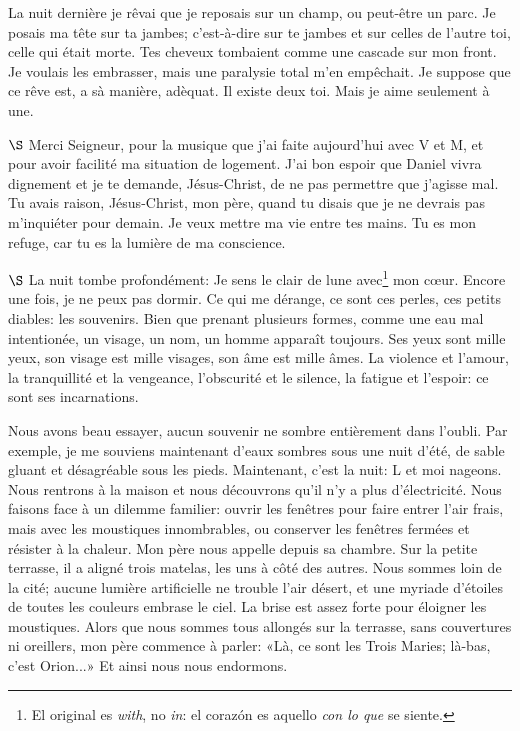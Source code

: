 \documentclass[a4paper, 12pt]{article}
\begin{document}
La nuit dernière je rêvai que je reposais sur un champ, ou peut-être un parc. Je
posais ma tête sur ta jambes; c'est-à-dire sur te jambes et sur celles de
l'autre toi, celle qui était morte. Tes cheveux tombaient comme une cascade sur
mon front. Je voulais les embrasser, mais une paralysie total m'en empêchait. Je
suppose que ce rêve est, a sà manière, adèquat. Il existe deux toi. Mais je aime
seulement à une.

\pagebreak 

$\S$ Merci Seigneur, pour la musique que j'ai faite aujourd'hui avec V et M, et pour
avoir facilité ma situation de logement. J'ai bon espoir que Daniel vivra
dignement et je te demande, Jésus-Christ, de ne pas permettre que j'agisse mal.
Tu avais raison, Jésus-Christ, mon père, quand tu disais que je ne devrais pas
m'inquiéter pour demain. Je veux mettre ma vie entre tes mains. Tu es mon
refuge, car tu es la lumière de ma conscience.

\pagebreak 

$\S$ La nuit tombe profondément: Je sens le clair de lune avec\footnote{El
original es \textit{with}, no \textit{in}: el corazón es aquello \textit{con lo
que} se siente.} mon cœur. Encore une fois, je ne peux pas dormir. Ce qui me
dérange, ce sont ces perles, ces petits diables: les souvenirs. Bien que prenant
plusieurs formes, comme une eau mal intentionée, un visage, un nom, un homme
apparaît toujours. Ses yeux sont mille yeux, son visage est mille visages, son
âme est mille âmes. La violence et l'amour, la tranquillité et la vengeance,
l'obscurité et le silence, la fatigue et l'espoir: ce sont ses incarnations.

Nous avons beau essayer, aucun souvenir ne sombre entièrement dans l'oubli. Par
exemple, je me souviens maintenant d'eaux sombres sous une nuit d'été, de sable
gluant et désagréable sous les pieds. Maintenant, c'est la nuit: L et moi
nageons. Nous rentrons à la maison et nous découvrons qu'il n'y a plus
d'électricité. Nous faisons face à un dilemme familier: ouvrir les fenêtres pour
faire entrer l'air frais, mais avec les moustiques innombrables, ou conserver
les fenêtres fermées et résister à la chaleur. Mon père nous appelle depuis sa
chambre. Sur la petite terrasse, il a aligné trois matelas, les uns à côté des
autres. Nous sommes loin de la cité; aucune lumière artificielle ne trouble
l'air désert, et une myriade d'étoiles de toutes les couleurs embrase le ciel.
La brise est assez forte pour éloigner les moustiques. Alors que nous sommes
tous allongés sur la terrasse, sans couvertures ni oreillers, mon père commence
à parler: «Là, ce sont les Trois Maries; là-bas, c'est Orion...» Et ainsi nous
nous endormons.
\end{document}
